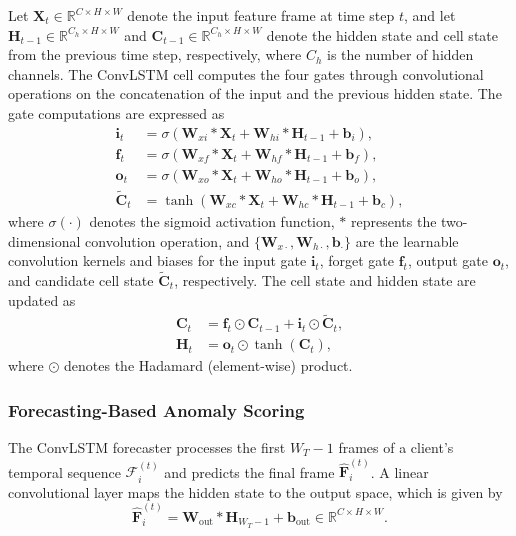 Let $\mathbf{X}_t \in \mathbb{R}^{C \times H \times W}$ denote the input feature frame at time step $t$, and let $\mathbf{H}_{t-1} \in \mathbb{R}^{C_h \times H \times W}$ and $\mathbf{C}_{t-1} \in \mathbb{R}^{C_h \times H \times W}$ denote the hidden state and cell state from the previous time step, respectively, where $C_h$ is the number of hidden channels. The ConvLSTM cell computes the four gates through convolutional operations on the concatenation of the input and the previous hidden state. The gate computations are expressed as
\begin{align}
    \mathbf{i}_t &= \sigma\left(\mathbf{W}_{xi} * \mathbf{X}_t + \mathbf{W}_{hi} * \mathbf{H}_{t-1} + \mathbf{b}_i\right), \label{eq:input_gate} \\
    \mathbf{f}_t &= \sigma\left(\mathbf{W}_{xf} * \mathbf{X}_t + \mathbf{W}_{hf} * \mathbf{H}_{t-1} + \mathbf{b}_f\right), \label{eq:forget_gate} \\
    \mathbf{o}_t &= \sigma\left(\mathbf{W}_{xo} * \mathbf{X}_t + \mathbf{W}_{ho} * \mathbf{H}_{t-1} + \mathbf{b}_o\right), \label{eq:output_gate} \\
    \widetilde{\mathbf{C}}_t &= \tanh\left(\mathbf{W}_{xc} * \mathbf{X}_t + \mathbf{W}_{hc} * \mathbf{H}_{t-1} + \mathbf{b}_c\right), \label{eq:candidate}
\end{align}
where $\sigma(\cdot)$ denotes the sigmoid activation function, $*$ represents the two-dimensional convolution operation, and $\{\mathbf{W}_{x\cdot}, \mathbf{W}_{h\cdot}, \mathbf{b}_{\cdot}\}$ are the learnable convolution kernels and biases for the input gate $\mathbf{i}_t$, forget gate $\mathbf{f}_t$, output gate $\mathbf{o}_t$, and candidate cell state $\widetilde{\mathbf{C}}_t$, respectively. The cell state and hidden state are updated as
\begin{align}
    \mathbf{C}_t &= \mathbf{f}_t \odot \mathbf{C}_{t-1} + \mathbf{i}_t \odot \widetilde{\mathbf{C}}_t, \label{eq:cell_update} \\
    \mathbf{H}_t &= \mathbf{o}_t \odot \tanh\left(\mathbf{C}_t\right), \label{eq:hidden_update}
\end{align}
where $\odot$ denotes the Hadamard (element-wise) product.

\subsubsection{Forecasting-Based Anomaly Scoring}

The ConvLSTM forecaster processes the first $W_T - 1$ frames of a client's temporal sequence $\mathcal{F}_i^{(t)}$ and predicts the final frame $\hat{\mathbf{F}}_i^{(t)}$. A linear convolutional layer maps the hidden state to the output space, which is given by
\begin{equation}\label{eq:pred}
    \hat{\mathbf{F}}_i^{(t)} = \mathbf{W}_{\text{out}} * \mathbf{H}_{W_T - 1} + \mathbf{b}_{\text{out}} \in \mathbb{R}^{C \times H \times W}.
\end{equation}

